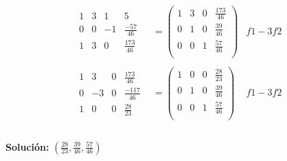 \[
  \begin{aligned}
    \begin{array}{ccc|c}
        1 & 3 & 1 & 5 \\
        0 & 0 & -1 & \frac{-57}{46} \\
        \hline
        1 & 3 & 0 & \frac{173}{46}
    \end{array}
    & =
    \left(
        \begin{array}{ccc|c}
            1 & 3 & 0 & \frac{173}{46} \\
            0 & 1 & 0 & \frac{39}{46} \\
            0 & 0 & 1 & \frac{57}{46} \\
        \end{array}
    \right)
    & f1-3f2 \\ \\
    \begin{array}{ccc|c}
        1 & 3 & 0 & \frac{173}{46} \\
        0 & -3 & 0 & \frac{-117}{46} \\
        \hline
        1 & 0 & 0 & \frac{28}{23}
    \end{array}
    & =
    \left(
        \begin{array}{ccc|c}
            1 & 0 & 0 & \frac{28}{23} \\
            0 & 1 & 0 & \frac{39}{46} \\
            0 & 0 & 1 & \frac{57}{46} \\
        \end{array}
    \right)
    & f1-3f2 \\ \\
  \end{aligned}  
\]

\begin{center}
    \textbf{Solución:} \(\left(\frac{28}{23}, \frac{39}{46}, \frac{57}{46}\right)\)
\end{center}